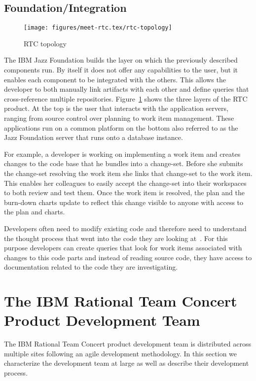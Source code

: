 \subsection{Foundation/Integration}
\begin{figure}[t]
\centering
\texttt{[image: figures/meet-rtc.tex/rtc-topology]}
\caption{RTC topology}
\label{fig:rtctopology}
\end{figure}
The IBM Jazz Foundation builds the layer on which the previously described components run.
By itself it does not offer any capabilities to the user, but it enables each component to be integrated with the others. 
This allows the developer to both manually link artifacts with each other and define queries that cross-reference multiple repositories.
Figure~\ref{fig:rtctopology} shows the three layers of the RTC product.
At the top is the user that interacts with the application servers, ranging from source control over planning to work item management.
These applications run on a common platform on the bottom also referred to as the Jazz Foundation server that runs onto a database instance.

For example, a developer is working on implementing a work item and creates changes to the code base that he bundles into a change-set.
Before she submits the change-set resolving the work item she links that change-set to the work item.
This enables her colleagues to easily accept the change-set into their workspaces to both review and test them.
Once the work item is resolved, the plan and the burn-down charts update to reflect this change visible to anyone with access to the plan and charts.

Developers often need to modify existing code and therefore need to understand the thought process that went into the code they are looking at~\cite{vonmayrhauser:ieeecomputer:1995}.
For this purpose developers can create queries that look for work items associated with changes to this code parts and instead of reading source code, they have access to documentation related to the code they are investigating.


\section{The IBM Rational Team Concert Product Development Team}
The IBM Rational Team Concert product development team is distributed across multiple sites following an agile development methodology.
In this section we characterize the development team at large as well as describe their development process.

